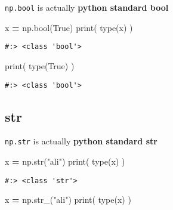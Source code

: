 \documentclass[
]{book}
\newenvironment{Shaded}{\begin{snugshade}}{\end{snugshade}}
\newcommand{\BuiltInTok}[1]{#1}
\newcommand{\NormalTok}[1]{#1}
\newcommand{\OperatorTok}[1]{\textcolor[rgb]{0.43,0.43,0.43}{\textbf{#1}}}
\newcommand{\StringTok}[1]{\textcolor[rgb]{0.5,0.5,0.5}{#1}}
\newcommand{\VariableTok}[1]{\textcolor[rgb]{0,0,0}{#1}}
\begin{document}
\texttt{np.bool} is actually \textbf{python standard bool}

\begin{Shaded}
\begin{Highlighting}[]
\NormalTok{x }\OperatorTok{=}\NormalTok{ np.}\BuiltInTok{bool}\NormalTok{(}\VariableTok{True}\NormalTok{)}
\BuiltInTok{print}\NormalTok{( }\BuiltInTok{type}\NormalTok{(x) )}
\end{Highlighting}
\end{Shaded}

\begin{verbatim}
#:> <class 'bool'>
\end{verbatim}

\begin{Shaded}
\begin{Highlighting}[]
\BuiltInTok{print}\NormalTok{( }\BuiltInTok{type}\NormalTok{(}\VariableTok{True}\NormalTok{) )}
\end{Highlighting}
\end{Shaded}

\begin{verbatim}
#:> <class 'bool'>
\end{verbatim}

\hypertarget{str}{%
\subsection{str}\label{str}}

\texttt{np.str} is actually \textbf{python standard str}

\begin{Shaded}
\begin{Highlighting}[]
\NormalTok{x }\OperatorTok{=}\NormalTok{ np.}\BuiltInTok{str}\NormalTok{(}\StringTok{"ali"}\NormalTok{)}
\BuiltInTok{print}\NormalTok{( }\BuiltInTok{type}\NormalTok{(x) )}
\end{Highlighting}
\end{Shaded}

\begin{verbatim}
#:> <class 'str'>
\end{verbatim}

\begin{Shaded}
\begin{Highlighting}[]
\NormalTok{x }\OperatorTok{=}\NormalTok{ np.str\_(}\StringTok{"ali"}\NormalTok{)}
\BuiltInTok{print}\NormalTok{( }\BuiltInTok{type}\NormalTok{(x) )}
\end{Highlighting}
\end{Shaded}
\end{document}
